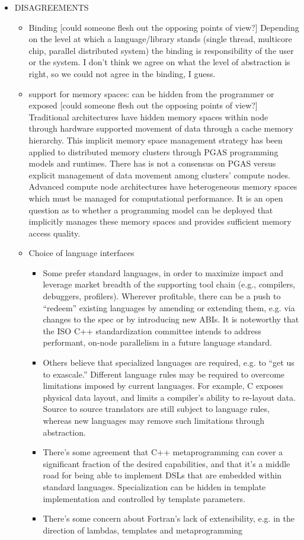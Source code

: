 \begin{itemize}
\begin{itemize}
\item  DISAGREEMENTS
  \begin{itemize}
  \item Binding [could someone flesh out the opposing points of view?] Depending on the level at which a language/library stands (single thread, multicore chip, parallel distributed system) the binding is responsibility of the user or the system. I don't think we agree on what the level of abstraction is right, so we could not agree in the binding, I guess.
  \item support for memory spaces: can be hidden from the programmer or exposed [could someone flesh out the opposing points of view?]  Traditional architectures have hidden memory spaces within node through hardware supported movement of data through a cache memory hierarchy.  This implicit memory space management strategy has been applied to distributed memory clusters through PGAS programming models and runtimes.  There has is not a consensus on PGAS versus explicit management of data movement among clusters' compute nodes.  Advanced compute node architectures have heterogeneous memory spaces which must be managed for computational performance.  It is an open question as to whether a programming model can be deployed that implicitly manages these memory spaces and provides sufficient memory access quality.

  \item Choice of language interfaces
    \begin{itemize}
    \item Some prefer standard languages, in order to maximize impact and leverage market breadth of the supporting tool chain (e.g., compilers, debuggers, profilers).  Wherever profitable, there can be a push to ``redeem'' existing languages by amending or extending them, e.g. via changes to the spec or by introducing new ABIs.  It is noteworthy that the ISO C++ standardization committee intends to address performant, on-node parallelism in a future language standard.
    \item Others believe that specialized languages are required, e.g. to ``get us to exascale.''  Different language rules may be required to overcome limitations imposed by current languages.  For example, C exposes physical data layout, and limits a compiler's ability to re-layout data.  Source to source translators are still subject to language rules, whereas new languages may remove such limitations through abstraction.
    \item There's some agreement that C++ metaprogramming can cover a significant fraction of the desired capabilities, and that it's a middle road for being able to implement DSLs that are embedded within standard languages.  Specialization can be hidden in template implementation and controlled by template parameters.
    \item There's some concern about Fortran's lack of extensibility, e.g. in the direction of lambdas, templates and metaprogramming
    \end{itemize}
  \end{itemize}


\end{itemize}
\end{itemize}
